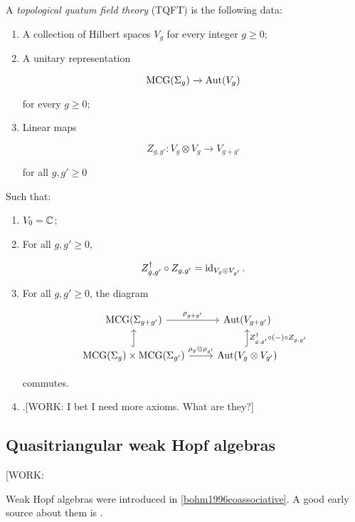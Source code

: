 \begin{defn}[TQFT] A \textit{topological quatum field theory} (TQFT) is the following data:

\begin{enumerate}
\item A collection of Hilbert spaces $V_{g}$ for every integer $g\geq 0$;
\item A unitary representation

$$\operatorname{MCG}(\Sigma_{g})\xrightarrow{}\operatorname{Aut}(V_{g})$$

for every $g\geq 0$;
\item Linear maps

$$Z_{g,g'}: V_g\otimes V_{g}\to V_{g+g'}$$

for all $g,g'\geq 0$
\end{enumerate}

Such that:

\begin{enumerate}

\item $V_{0}={\mathbb C}$;

\item For all $g,g'\geq 0$,

$$Z_{g,g'}^\dagger \circ Z_{g,g'}=\operatorname{id}_{V_{g}\otimes V_{g'}}.$$

\item For all $g,g'\geq 0$, the diagram

\[\begin{tikzcd}
	{\MCG(\Sigma_{g+g'})} & {\Aut(V_{g+g'})} \\
	{\MCG(\Sigma_g)\times \MCG(\Sigma_{g'})} & {\Aut(V_g\otimes V_{g'})}
	\arrow["{\rho_{g+g'}}", from=1-1, to=1-2]
	\arrow[hook, from=2-1, to=1-1]
	\arrow["{\rho_{g}\otimes \rho_{g'}}", from=2-1, to=2-2]
	\arrow["{Z_{g,g'}^\dagger \circ (\--)\circ Z_{g,g'}}"', hook, from=2-2, to=1-2]
\end{tikzcd}\]

commutes.

\item .[WORK: I bet I need more axioms. What are they?]
\end{enumerate}
\end{defn}

\subsection{Quasitriangular weak Hopf algebras}

[WORK:

Weak Hopf algebras were introduced in \ref{bohm1996coassociative}. A good early source about them is \cite{nikshych2004semisimple}.

